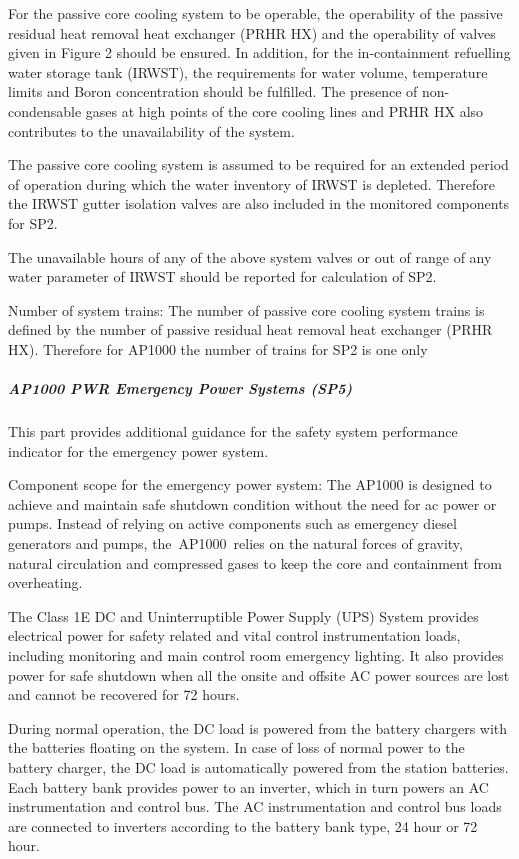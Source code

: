 For the passive core cooling system to be operable, the operability of
the passive residual heat removal heat exchanger (PRHR HX) and the
operability of valves given in Figure 2 should be ensured. In
addition, for the in-containment refuelling water storage tank
(IRWST), the requirements for water volume, temperature limits and
Boron concentration should be fulfilled. The presence of
non-condensable gases at high points of the core cooling lines and
PRHR HX also contributes to the unavailability of the system.

The passive core cooling system is assumed to be required for an
extended period of operation during which the water inventory of IRWST
is depleted. Therefore the IRWST gutter isolation valves are also
included in the monitored components for SP2.

The unavailable hours of any of the above system valves or out of
range of any water parameter of IRWST should be reported for
calculation of SP2.

Number of system trains:  The number of passive core cooling system trains is defined by the number of passive residual heat removal heat exchanger (PRHR HX). Therefore for AP1000 the number of trains for SP2 is one only



\subparagraph{AP1000 PWR Emergency Power Systems (SP5)}

This part provides additional guidance for the safety system
performance indicator for the emergency power system.

Component scope for the emergency power system: The AP1000 is designed
to achieve and maintain safe shutdown condition without the need for
ac power or pumps. Instead of relying on active components such as
emergency diesel generators and pumps, the AP1000 relies on the
natural forces of gravity, natural circulation and compressed gases to
keep the core and containment from overheating.

The Class 1E DC and Uninterruptible Power Supply (UPS) System provides
electrical power for safety related and vital control instrumentation
loads, including monitoring and main control room emergency
lighting. It also provides power for safe shutdown when all the onsite
and offsite AC power sources are lost and cannot be recovered for 72
hours.

During normal operation, the DC load is powered from the battery
chargers with the batteries floating on the system. In case of loss of
normal power to the battery charger, the DC load is automatically
powered from the station batteries. Each battery bank provides power
to an inverter, which in turn powers an AC instrumentation and control
bus. The AC instrumentation and control bus loads are connected to
inverters according to the battery bank type, 24 hour or 72 hour.

